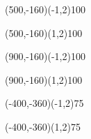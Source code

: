 \documentclass[12pt]{article}
\begin{document}
\begin{figure}[htb]
\begin{egame}
\putbranch(500,-160)(-1,2){100}

\renewcommand{\egarrowstyle}{}

\putbranch(500,-160)(1,2){100}

\renewcommand{\egarrowstyle}{e}

\putbranch(900,-160)(-1,2){100}

\renewcommand{\egarrowstyle}{}

\putbranch(900,-160)(1,2){100}




\renewcommand{\egarrowstyle}{}

\putbranch(-400,-360)(-1,2){75}

\renewcommand{\egarrowstyle}{}

\putbranch(-400,-360)(1,2){75}




\end{egame}
\end{figure}
\end{document}
